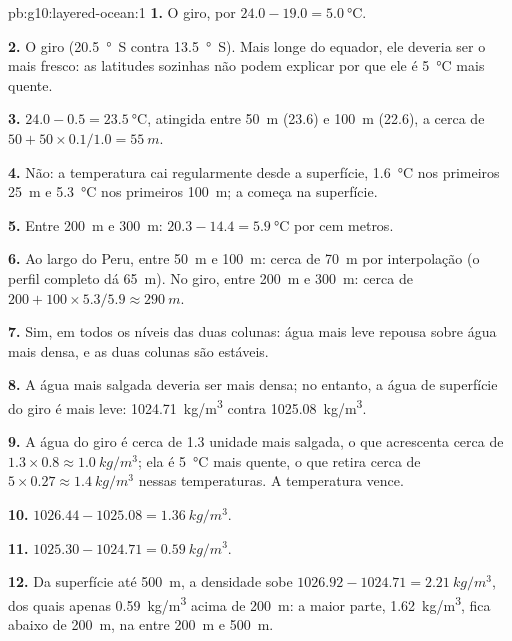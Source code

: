 \begin{solution}{pb:g10:layered-ocean:1}
\textbf{1.} O giro, por $24.0 - 19.0 = \qty{5.0}{\degreeCelsius}$.

\textbf{2.} O giro (\qty{20.5}{\degree S} contra \qty{13.5}{\degree S}).
Mais longe do equador, ele deveria ser o mais fresco: as latitudes sozinhas
não podem explicar por que ele é \qty{5}{\degreeCelsius} mais quente.

\textbf{3.} $24.0 - 0.5 = \qty{23.5}{\degreeCelsius}$, atingida entre
\qty{50}{m} (23.6) e \qty{100}{m} (22.6), a cerca de $50 + 50 \times
0.1/1.0 = \qty{55}{m}$.

\textbf{4.} Não: a temperatura cai regularmente desde a superfície,
\qty{1.6}{\degreeCelsius} nos primeiros \qty{25}{m} e
\qty{5.3}{\degreeCelsius} nos primeiros \qty{100}{m}; a  começa na
superfície.

\textbf{5.} Entre \qty{200}{m} e \qty{300}{m}: $20.3 - 14.4 =
\qty{5.9}{\degreeCelsius}$ por cem metros.

\textbf{6.} Ao largo do Peru, entre \qty{50}{m} e \qty{100}{m}: cerca de
\qty{70}{m} por interpolação (o perfil completo dá \qty{65}{m}). No giro,
entre \qty{200}{m} e \qty{300}{m}: cerca de $200 + 100 \times 5.3/5.9
\approx \qty{290}{m}$.

\textbf{7.} Sim, em todos os níveis das duas colunas: água mais leve repousa
sobre água mais densa, e as duas colunas são estáveis.

\textbf{8.} A água mais salgada deveria ser mais densa; no entanto, a água
de superfície do giro é mais leve: \qty{1024.71}{kg/m^3} contra
\qty{1025.08}{kg/m^3}.

\textbf{9.} A água do giro é cerca de 1.3 unidade mais salgada, o que
acrescenta cerca de $1.3 \times 0.8 \approx \qty{1.0}{kg/m^3}$; ela é
\qty{5}{\degreeCelsius} mais quente, o que retira cerca de
$5 \times 0.27 \approx \qty{1.4}{kg/m^3}$ nessas temperaturas. A
temperatura vence.

\textbf{10.} $1026.44 - 1025.08 = \qty{1.36}{kg/m^3}$.

\textbf{11.} $1025.30 - 1024.71 = \qty{0.59}{kg/m^3}$.

\textbf{12.} Da superfície até \qty{500}{m}, a densidade sobe
$1026.92 - 1024.71 = \qty{2.21}{kg/m^3}$, dos quais apenas
\qty{0.59}{kg/m^3} acima de \qty{200}{m}: a maior parte,
\qty{1.62}{kg/m^3}, fica abaixo de \qty{200}{m}, na  entre
\qty{200}{m} e \qty{500}{m}.


\end{solution}
